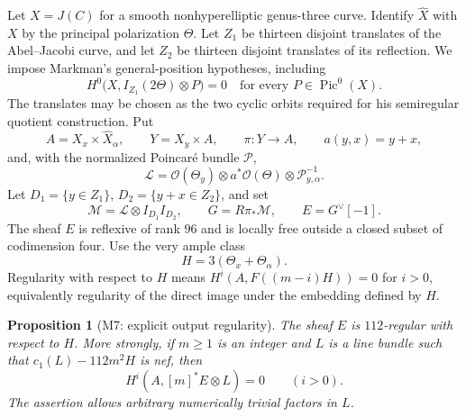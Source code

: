 \documentclass[11pt,a4paper]{article}
\newtheorem{proposition}[theorem]{Proposition}
\theoremstyle{definition}\newtheorem{definition}[theorem]{Definition}
\theoremstyle{remark}\newtheorem{remark}[theorem]{Remark}
\newcommand{\cO}{\mathcal O}\newcommand{\CH}{\operatorname{CH}}\newcommand{\cl}{\operatorname{cl}}
\begin{document}
Let $X=J(C)$ for a smooth nonhyperelliptic genus-three curve. Identify
$\widehat X$ with $X$ by the principal polarization $\Theta$.
Let $Z_1$ be thirteen disjoint translates of the Abel--Jacobi curve, and
let $Z_2$ be thirteen disjoint translates of its reflection. We impose
Markman's general-position hypotheses, including
\begin{equation}\label{eq:M7H0}
 H^0\bigl(X,I_{Z_1}(2\Theta)\otimes P\bigr)=0
 \quad\text{for every }P\in\operatorname{Pic}^0(X).
\end{equation}
The translates may be chosen as the two cyclic orbits required for his
semiregular quotient construction. Put
\[
 A=X_x\times\widehat X_\alpha,\qquad Y=X_y\times A,\qquad
 \pi:Y\longrightarrow A,\qquad a(y,x)=y+x,
\]
and, with the normalized Poincar\'e bundle $\mathcal P$,
\[
 \mathcal L=\cO(\Theta_y)\otimes a^*\cO(\Theta)
                  \otimes\mathcal P_{y,\alpha}^{-1}.
\]
Let $D_1=\{y\in Z_1\}$, $D_2=\{y+x\in Z_2\}$, and set
\[
 \mathcal M=\mathcal L\otimes I_{D_1}I_{D_2},\qquad
 G=R\pi_*\mathcal M,\qquad E=G^\vee[-1].
\]
The sheaf $E$ is reflexive of rank $96$ and is locally free outside a
closed subset of codimension four. Use the very ample class
\[
 H=3(\Theta_x+\Theta_\alpha).
\]
Regularity with respect to $H$ means
$H^i(A,F((m-i)H))=0$ for $i>0$, equivalently regularity of the direct
image under the embedding defined by $H$.

\begin{proposition}[M7: explicit output regularity]\label{M7}
The sheaf $E$ is $112$-regular with respect to $H$. More strongly, if
$m\ge1$ is an integer and $L$ is a line bundle such that
$c_1(L)-112m^2H$ is nef, then
\begin{equation}\label{eq:M7strong}
 H^i(A,[m]^*E\otimes L)=0\qquad(i>0).
\end{equation}
The assertion allows arbitrary numerically trivial factors in $L$.
\end{proposition}
\end{document}
